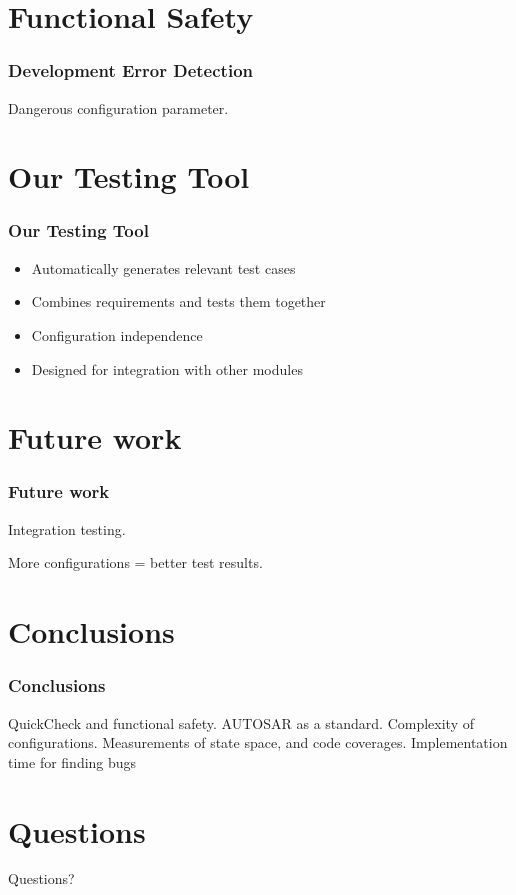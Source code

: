 \documentclass{beamer}
\begin{document}
\section{Functional Safety}
\begin{frame}[fragile]
  \frametitle{Development Error Detection}
  Dangerous configuration parameter.
\end{frame}

\section{Our Testing Tool}
\begin{frame}
  \frametitle{Our Testing Tool}
  \begin{itemize}
        \item Automatically generates relevant test cases
        \item Combines requirements and tests them together
        \item Configuration independence
        \item Designed for integration with other modules
  \end{itemize}
  \end{frame}


\section{Future work}
\begin{frame}[fragile]
  \frametitle{Future work}
  Integration testing.

  More configurations = better test results.
\end{frame}

\section{Conclusions}
\begin{frame}
  \frametitle{Conclusions}
  QuickCheck and functional safety.
  AUTOSAR as a standard.
  Complexity of configurations.
  Measurements of state space, and code coverages.
  Implementation time for finding bugs
\end{frame}

\section{Questions}
\begin{frame}
  \Huge{\centerline{Questions?}}
\end{frame}
\end{document}
